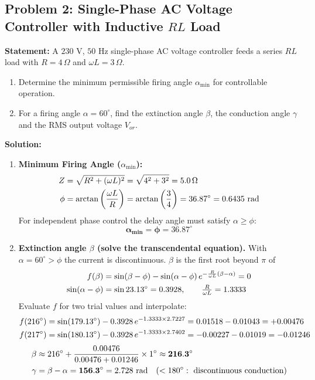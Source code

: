 \documentclass[11pt,a4paper]{article}
\let\origsubsection\subsection
\renewcommand{\subsection}{\Needspace{7\baselineskip}\origsubsection}
\begin{document}
\subsection{Problem 2: Single-Phase AC Voltage Controller with Inductive $RL$ Load}
\begin{examplebox}
\textbf{Statement:} A $230\text{ V}$, $50\text{ Hz}$ single-phase AC voltage controller feeds a series $RL$ load with $R = 4\,\Omega$ and $\omega L = 3\,\Omega$.
\begin{enumerate}
  \item Determine the minimum permissible firing angle $\alpha_{\text{min}}$ for controllable operation.
  \item For a firing angle $\alpha = 60^\circ$, find the extinction angle $\beta$, the conduction angle $\gamma$ and the RMS output voltage $V_{or}$.
\end{enumerate}

\tcblower
\textbf{Solution:}
\begin{enumerate}
  \item \textbf{Minimum Firing Angle ($\alpha_{\text{min}}$):}
  \begin{align*}
  Z &= \sqrt{R^2 + (\omega L)^2} = \sqrt{4^2 + 3^2} = 5.0\,\Omega \notag\\
  \phi &= \arctan\left(\frac{\omega L}{R}\right) = \arctan\left(\frac{3}{4}\right) = 36.87^\circ = 0.6435\text{ rad}
  \end{align*}
  For independent phase control the delay angle must satisfy $\alpha \ge \phi$:
  \begin{equation*}
  \mathbf{\alpha_{\text{min}} = \phi = 36.87^\circ}
  \end{equation*}

  \item \textbf{Extinction angle $\beta$ (solve the transcendental equation).} With $\alpha = 60^\circ > \phi$ the current is discontinuous. $\beta$ is the first root beyond $\pi$ of
  \begin{align*}
  f(\beta) &= \sin(\beta - \phi) - \sin(\alpha - \phi)\,e^{-\frac{R}{\omega L}(\beta - \alpha)} = 0 \notag\\
  \sin(\alpha-\phi) &= \sin 23.13^\circ = 0.3928,\qquad \tfrac{R}{\omega L} = 1.3333
  \end{align*}
  Evaluate $f$ for two trial values and interpolate:
  \begin{align*}
  f(216^\circ) &= \sin(179.13^\circ) - 0.3928\,e^{-1.3333\times 2.7227} = 0.01518 - 0.01043 = +0.00476 \notag\\
  f(217^\circ) &= \sin(180.13^\circ) - 0.3928\,e^{-1.3333\times 2.7402} = -0.00227 - 0.01019 = -0.01246
  \end{align*}
  \begin{align*}
  \beta &\approx 216^\circ + \frac{0.00476}{0.00476 + 0.01246}\times 1^\circ \approx \mathbf{216.3^\circ} \notag\\
  \mathbf{\gamma} &= \beta - \alpha = \mathbf{156.3^\circ} = 2.728\text{ rad} \quad (<180^\circ:\ \text{discontinuous conduction})
  \end{align*}


\end{enumerate}
\end{examplebox}
\end{document}

